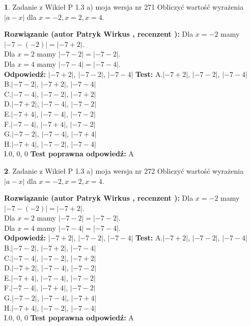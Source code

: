 \documentclass[12pt, a4paper]{article}
\theoremstyle{definition} %
\newtheorem{zad}{}
\newcommand{\zadStart}[1]{\begin{zad}#1\newline}
\newcommand{\zadStop}{\end{zad}}
\newcommand{\rozwStart}[2]{\noindent \textbf{Rozwiązanie (autor #1 , recenzent #2): }\newline}
\newcommand{\rozwStop}{\newline}
\newcommand{\odpStart}{\noindent \textbf{Odpowiedź:}\newline}
\newcommand{\odpStop}{\newline}
\newcommand{\testStart}{\noindent \textbf{Test:}\newline}
\newcommand{\testStop}{\newline}
\newcommand{\kluczStart}{\noindent \textbf{Test poprawna odpowiedź:}\newline}
\newcommand{\kluczStop}{\newline}
\begin{document}
\zadStart{Zadanie z Wikieł P 1.3 a) moja wersja nr 271}
Obliczyć wartość wyrażenia $|a - x|$ dla $x=-2,x=2,x=4$.
\zadStop
\rozwStart{Patryk Wirkus}{}
Dla $x = -2$ mamy $|-7 - (-2)| = |-7 + 2|$.\\
Dla $x = 2$ mamy $|-7 - 2| = |-7 - 2|$.\\
Dla $x = 4$ mamy $|-7 - 4| = |-7 - 4|$.\\
\rozwStop
\odpStart
$|-7 + 2|$, $|-7 - 2|$, $|-7 - 4|$
\odpStop
\testStart
A.$|-7 + 2|$, $|-7 - 2|$, $|-7 - 4|$\\
B.$|-7 - 2|$, $|-7 + 2|$, $|-7 - 4|$\\
C.$|-7 - 4|$, $|-7 - 2|$, $|-7 + 2|$\\
D.$|-7 + 2|$, $|-7 - 4|$, $|-7 - 2|$\\
E.$|-7 + 4|$, $|-7 - 4|$, $|-7 - 2|$\\
F.$|-7 - 4|$, $|-7 + 4|$, $|-7 - 2|$\\
G.$|-7 - 2|$, $|-7 - 4|$, $|-7 + 4|$\\
H.$|-7 + 4|$, $|-7 - 2|$, $|-7 - 4|$\\
I.$0$, $0$, $0$
\testStop
\kluczStart
A
\kluczStop



\zadStart{Zadanie z Wikieł P 1.3 a) moja wersja nr 272}
Obliczyć wartość wyrażenia $|a - x|$ dla $x=-2,x=2,x=4$.
\zadStop
\rozwStart{Patryk Wirkus}{}
Dla $x = -2$ mamy $|-7 - (-2)| = |-7 + 2|$.\\
Dla $x = 2$ mamy $|-7 - 2| = |-7 - 2|$.\\
Dla $x = 4$ mamy $|-7 - 4| = |-7 - 4|$.\\
\rozwStop
\odpStart
$|-7 + 2|$, $|-7 - 2|$, $|-7 - 4|$
\odpStop
\testStart
A.$|-7 + 2|$, $|-7 - 2|$, $|-7 - 4|$\\
B.$|-7 - 2|$, $|-7 + 2|$, $|-7 - 4|$\\
C.$|-7 - 4|$, $|-7 - 2|$, $|-7 + 2|$\\
D.$|-7 + 2|$, $|-7 - 4|$, $|-7 - 2|$\\
E.$|-7 + 4|$, $|-7 - 4|$, $|-7 - 2|$\\
F.$|-7 - 4|$, $|-7 + 4|$, $|-7 - 2|$\\
G.$|-7 - 2|$, $|-7 - 4|$, $|-7 + 4|$\\
H.$|-7 + 4|$, $|-7 - 2|$, $|-7 - 4|$\\
I.$0$, $0$, $0$
\testStop
\kluczStart
A
\kluczStop
\end{document}

